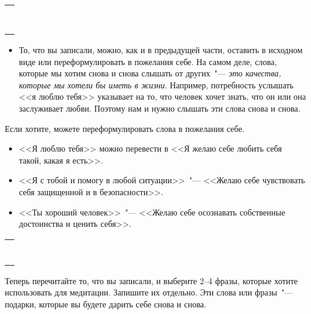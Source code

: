 \setlength{\extrarowheight}{2mm}
\begin{tabularx}{0.96\textwidth}{X}
	\\
	\arrayrulecolor{gray}\hline\\
	\hline\\
	\hline\\
	\hline\\
	\hline\\
	\hline\\
	\hline\\
	\hline\\
	\hline\\
\end{tabularx}
\setlength{\extrarowheight}{0mm}
\begin{itemize}
	\item То, что вы записали, можно, как и в предыдущей части, оставить в исходном виде или переформулировать в пожелания себе. На самом деле, слова, которые мы хотим снова и снова слышать  от других~"--- \emph{это качества, которые мы хотели бы иметь в жизни}. Например, потребность услышать <<я люблю тебя>> указывает на то, что человек хочет знать, что он или она заслуживает любви. Поэтому нам и нужно слышать эти слова снова и снова.
\end{itemize}

\vspace{4ex}

\begin{itemize}
	\itemWritingHand Если хотите, можете переформулировать слова в пожелания себе.
	\begin{itemize}
		\item <<Я люблю тебя>> можно перевести в <<Я желаю себе любить себя такой, какая я есть>>.
		
		\item <<Я с тобой и помогу в любой ситуации>>~"--- <<Желаю себе чувствовать себя защищенной и в безопасности>>.
		
		\item <<Ты хороший человек>>~"--- <<Желаю себе осознавать собственные достоинства и ценить себя>>.
	\end{itemize}
\end{itemize}

\setlength{\extrarowheight}{2mm}
\begin{tabularx}{0.96\textwidth}{X}
	\\
	\arrayrulecolor{gray}\hline\\
	\hline\\
	\hline\\
	\hline\\
	\hline\\
	\hline\\
	\hline\\
	\hline\\
\end{tabularx}
\setlength{\extrarowheight}{0mm}
\begin{itemize}
	\itemWritingHand Теперь перечитайте то, что вы записали, и выберите 2--4 фразы, которые хотите использовать для медитации. Запишите их отдельно. Эти слова или фразы~"--- подарки, которые вы будете дарить себе снова и снова.
\end{itemize}


